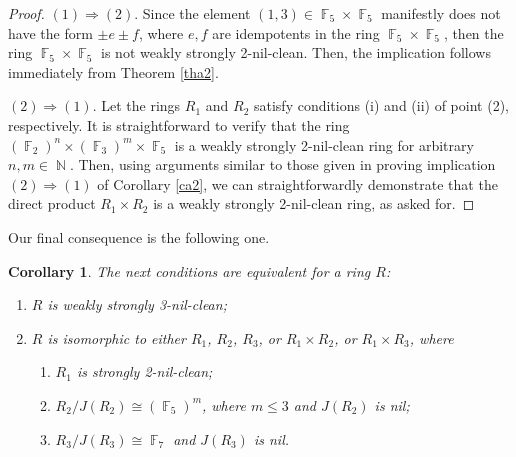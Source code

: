 \documentclass{amsart}
\DeclareMathOperator{\N}{\mathbb{N}}
\DeclareMathOperator{\F}{\mathbb{F}}
\newtheorem{corollary}[theorem]{Corollary}
\theoremstyle{definition}
\theoremstyle{remark}
\numberwithin{equation}{section}
\begin{document}
\begin{proof}
$(1) \Rightarrow (2)$. Since the element $(1, 3)\in \F_5\times \F_5$ manifestly does not have the form $\pm e\pm f$, where $e, f$ are idempotents in the ring $\F_5\times \F_5$, then the ring $\F_5\times \F_5$ is not weakly strongly 2-nil-clean. Then, the implication follows immediately from Theorem \ref{tha2}.

$(2) \Rightarrow (1)$. Let the rings $R_1$ and $R_2$ satisfy conditions (i) and (ii) of point (2), respectively. It is straightforward to verify that the ring $(\F_2)^{n}\times (\F_3)^{m}\times \F_5$ is a weakly strongly 2-nil-clean ring for arbitrary $n,m\in \N$. Then, using arguments similar to those given in proving implication $(2) \Rightarrow (1)$ of Corollary \ref{ca2}, we can straightforwardly demonstrate that the direct product $R_1\times R_2$ is a weakly strongly 2-nil-clean ring, as asked for.
\end{proof}

Our final consequence is the following one.

\begin{corollary} The next conditions are equivalent for a ring $R$:
\begin{enumerate}

\item[(1)] $R$ is weakly strongly 3-nil-clean;
\item[(2)] $R$ is isomorphic to either $R_1$, $R_2$, $R_3$, or $R_1\times R_2$, or $R_1\times R_3$, where
\begin{enumerate}
\item[(i)] $R_1$ is strongly 2-nil-clean;
\item[(ii)] $R_2/J(R_2)\cong (\F_5)^m$, where $m\leq 3$ and $J(R_2)$ is nil;
\item[(iii)] $R_3/J(R_3)\cong \F_7$ and $J(R_3)$ is nil.
\end{enumerate}

\end{enumerate}
\end{corollary}
\end{document}

